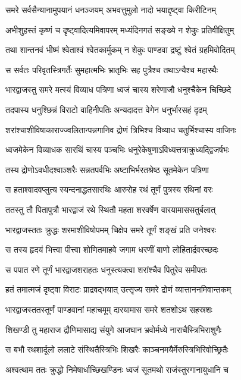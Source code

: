 \twolineshloka
{समरे सर्वसैन्यानामुपयानं धनञ्जयम्}
{अभवत्तुमुलो नादो भयाद्दृष्ट्वा किरीटिनम्}


\twolineshloka
{अभीशुहस्तं कृष्णं च दृष्ट्वादित्यमिवापरम्}
{मध्यंदिनगतं सङ्ख्ये न शेकुः प्रतिवीक्षितुम्}


\twolineshloka
{तथा शान्तनवं भीष्मं श्वेताश्वं श्वेतकार्मुकम्}
{न शेकुः पाण्डवा द्रष्टुं श्वेतं ग्रहमिवोदितम्}


\twolineshloka
{स सर्वतः परिवृतस्त्रिगर्तैः सुमहात्मभिः}
{भ्रातृभिः सह पुत्रैश्च तथाऽन्यैश्च महारथैः}


\twolineshloka
{भारद्वाजस्तु समरे मत्स्यं विव्याध पत्रिणा}
{ध्वजं चास्य शरेणाजौ धनुश्चैकेन चिच्छिदे}


\twolineshloka
{तदपास्य धनुश्छिन्नं विराटो वाहिनीपतिः}
{अन्यदादत्त वेगेन धनुर्भारसहं दृढम्}


\twolineshloka
{शरांश्चाशीविषाकाराज्ज्वलितान्पन्नगानिव}
{द्रोणं त्रिभिश्च विव्याध चतुर्भिश्चास्य वाजिनः}


\twolineshloka
{ध्वजमेकेन विव्याधक सारथिं चास्य पञ्चभिः}
{धनुरेकेषुणाऽविध्यत्तत्राक्रुध्यद्द्विजर्षभः}


\twolineshloka
{तस्य द्रोणोऽवधीदश्वाञ्शरैः सन्नतपर्वभिः}
{अष्टाभिर्भरतश्रेष्ठ सूतमेकेन पत्रिणा}


\twolineshloka
{स हताश्वादवप्लुत्य स्यन्दनाद्धतसारथिः}
{आरुरोह रथं तूर्णं पुत्रस्य रथिनां वरः}


\twolineshloka
{ततस्तु तौ पितापुत्रौ भारद्वाजं रथे स्थितौ}
{महता शरवर्षेण वारयामाससतुर्बलात्}


\twolineshloka
{भारद्वाजस्ततः क्रुद्धः शरमाशीविषोपमम्}
{चिक्षेप समरे तूर्णं शङ्खं प्रति जनेश्वरः}


\twolineshloka
{स तस्य हृदयं भित्त्वा पीत्त्वा शोणितमाहवे}
{जगाम धरणीं बाणो लोहितार्द्रवरच्छदः}


\twolineshloka
{स पपात रणे तूर्णं भारद्वाजशराहतः}
{धनुस्त्यक्त्वा शरांश्चैव पितुरेव समीपतः}


\twolineshloka
{हतं तमात्मजं दृष्ट्वा विराटः प्राद्रवद्भयात्}
{उत्सृज्य समरे द्रोणं व्यात्ताननमिवान्तकम्}


\twolineshloka
{भारद्वाजस्ततस्तूर्णं पाण्डवानां महाचमूम्}
{दारयामास समरे शतशोऽथ सहस्रशः}


\twolineshloka
{शिखण्डी तु महाराज द्रौणिमासाद्य संयुगे}
{आजघान भ्रवोर्मध्ये नाराचैस्त्रिभिराशुगैः}


\twolineshloka
{स बभौ रथशार्दूलो ललाटे संस्थितैस्त्रिभिः}
{शिखरैः काञ्चनमयैर्मेरुस्त्रिभिरिवोच्छ्रितैः}


\twolineshloka
{अश्वत्थाम ततः क्रुद्धो निमेषार्धाच्छिखण्डिनः}
{ध्वजं सूतमथो राजंस्तुरगानायुधानि च}


